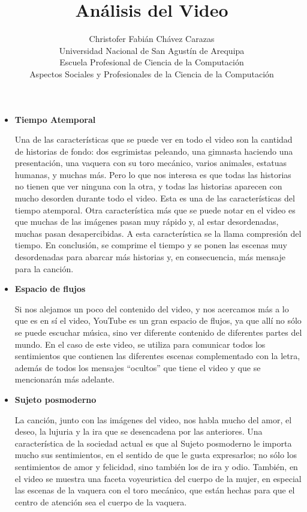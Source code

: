 \documentclass[a4paper,12pt]{article}
\begin{document}
\title{Análisis del Video}
\author{
Christofer Fabián Chávez Carazas \\
\small{Universidad Nacional de San Agustín de Arequipa} \\
\small{Escuela Profesional de Ciencia de la Computación} \\
\small{Aspectos Sociales y Profesionales de la Ciencia de la Computación}
}
\date{}

\maketitle

\begin{itemize}
 \item \textbf{Tiempo Atemporal}
 
 Una de las características que se puede ver en todo el video son la cantidad de historias de fondo: dos esgrimistas peleando, una gimnasta haciendo una presentación, una vaquera con
 su toro mecánico, varios animales, estatuas humanas, y muchas más. Pero lo que nos interesa es que todas las historias no tienen que ver ninguna con la otra, y todas las
 historias aparecen con mucho desorden durante todo el video. Esta es una de las características del tiempo atemporal. Otra característica más que se puede notar en el
 video es que muchas de las imágenes pasan muy rápido y, al estar desordenadas, muchas pasan desapercibidas. A esta característica se la llama compresión del tiempo.
 En conclusión, se comprime el tiempo y se ponen las escenas muy desordenadas para abarcar más historias y, en consecuencia, más mensaje para la canción.
 
 \item \textbf{Espacio de flujos}
 
 Si nos alejamos un poco del contenido del video, y nos acercamos más a lo que es en sí el video, YouTube es un gran espacio de flujos, ya que allí no sólo se
 puede escuchar música, sino ver diferente contenido de diferentes partes del mundo. En el caso de este video, se utiliza para comunicar todos los sentimientos que contienen
 las diferentes escenas complementado con la letra, además de todos los mensajes ``ocultos'' que tiene el video y que se mencionarán más adelante. 
 
 
 \item \textbf{Sujeto posmoderno}
 
 La canción, junto con las imágenes del video, nos habla mucho del amor, el deseo, la lujuria y la ira que se desencadena por las anteriores. Una característica de
 la sociedad actual es que al Sujeto posmoderno le importa mucho sus sentimientos, en el sentido de que le gusta expresarlos; no sólo los sentimientos de amor y felicidad,
 sino también los de ira y odio. También, en el video se muestra una faceta voyeuristica del cuerpo de la mujer, en especial las escenas de la vaquera con el toro mecánico,
 que están hechas para que el centro de atención sea el cuerpo de la vaquera.
 

\end{itemize}
\end{document}
